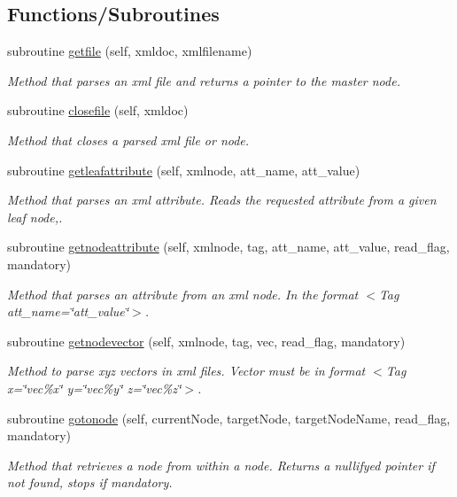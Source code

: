 \subsection*{Functions/\+Subroutines}
\begin{DoxyCompactItemize}
\item 
subroutine \mbox{\hyperlink{namespacexmlparser__mod_aa1f6c9620a625b407c80c9053492a21c}{getfile}} (self, xmldoc, xmlfilename)
\begin{DoxyCompactList}\small\item\em Method that parses an xml file and returns a pointer to the master node. \end{DoxyCompactList}\item 
subroutine \mbox{\hyperlink{namespacexmlparser__mod_a9eed98475e0d55a3c7b2eeb88925a48c}{closefile}} (self, xmldoc)
\begin{DoxyCompactList}\small\item\em Method that closes a parsed xml file or node. \end{DoxyCompactList}\item 
subroutine \mbox{\hyperlink{namespacexmlparser__mod_a3e977c7792b08b009a09cc1f7fb4f80a}{getleafattribute}} (self, xmlnode, att\+\_\+name, att\+\_\+value)
\begin{DoxyCompactList}\small\item\em Method that parses an xml attribute. Reads the requested attribute from a given leaf node,. \end{DoxyCompactList}\item 
subroutine \mbox{\hyperlink{namespacexmlparser__mod_ade14a3d90326f84cfa52844aa4a16b75}{getnodeattribute}} (self, xmlnode, tag, att\+\_\+name, att\+\_\+value, read\+\_\+flag, mandatory)
\begin{DoxyCompactList}\small\item\em Method that parses an attribute from an xml node. In the format \textquotesingle{}$<$\+Tag att\+\_\+name=\char`\"{}att\+\_\+value\char`\"{}$>$\textquotesingle{}. \end{DoxyCompactList}\item 
subroutine \mbox{\hyperlink{namespacexmlparser__mod_a0c2ac0513cee4e660e07cb083a790a53}{getnodevector}} (self, xmlnode, tag, vec, read\+\_\+flag, mandatory)
\begin{DoxyCompactList}\small\item\em Method to parse xyz vectors in xml files. Vector must be in format \textquotesingle{}$<$\+Tag x=\char`\"{}vec\%x\char`\"{} y=\char`\"{}vec\%y\char`\"{} z=\char`\"{}vec\%z\char`\"{}$>$\textquotesingle{}. \end{DoxyCompactList}\item 
subroutine \mbox{\hyperlink{namespacexmlparser__mod_acd860c3d06a25fc422edbcc3d356d976}{gotonode}} (self, current\+Node, target\+Node, target\+Node\+Name, read\+\_\+flag, mandatory)
\begin{DoxyCompactList}\small\item\em Method that retrieves a node from within a node. Returns a nullifyed pointer if not found, stops if mandatory. \end{DoxyCompactList}\end{DoxyCompactItemize}

